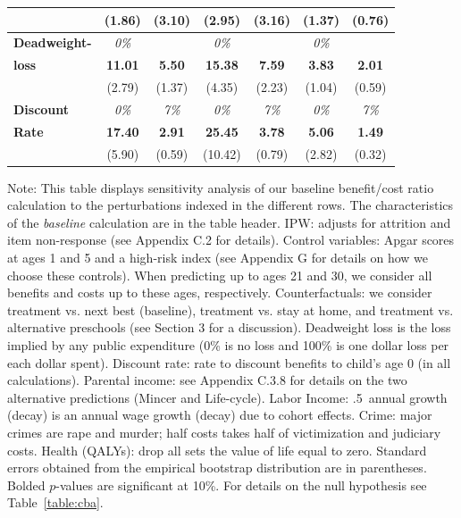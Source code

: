 \documentclass[static]{JJH-Beamer}
\begin{document}
\begin{frame}
\begin{table}[H]
\begin{center}
{\begin{tabular}{>{\bfseries}lcc|cc|cc}
	&	(1.86)	&	(3.10)	&	(2.95)	&	(3.16)	&	(1.37)	&	(0.76)	\\ \midrule
Deadweight-	&	\textit{0\%}	&	\textit{100\%\textit}	&	\textit{0\%}	&	\textit{100\%\textit}	&	\textit{0\%}	&	\textit{100\%\textit}	\\
loss	&	\textbf{11.01}	&	\textbf{5.50}	&	\textbf{15.38}	&	\textbf{7.59}	&	\textbf{3.83}	&	\textbf{2.01}	\\
	&	(2.79)	&	(1.37)	&	(4.35)	&	(2.23)	&	(1.04)	&	(0.59)	\\ \midrule
Discount 	&	\textit{0\%}	&	\textit{7\%}	&	\textit{0\%}	&	\textit{7\%}	&	\textit{0\%}	&	\textit{7\%}	\\
Rate	&	\textbf{17.40}	&	\textbf{2.91}	&	\textbf{25.45}	&	\textbf{3.78}	&	\textbf{5.06}	&	\textbf{1.49}	\\
	&	(5.90)	&	(0.59)	&	(10.42)	&	(0.79)	&	(2.82)	&	(0.32)	\\ 
\bottomrule
\end{tabular}
}
\end{center}
\end{table}

\end{frame}

{\flushleft \small Note: This table displays sensitivity analysis of our baseline benefit/cost ratio calculation to the perturbations indexed in the different rows. The characteristics of the \textit{baseline} calculation are in the table header. IPW: adjusts for attrition and item non-response (see Appendix C.2 for details). Control variables: Apgar scores at ages 1 and 5 and a high-risk index (see Appendix G for details on how we choose these controls). When predicting up to ages 21 and 30, we consider all benefits and costs up to these ages, respectively. Counterfactuals: we consider treatment vs. next best (baseline), treatment vs. stay at home, and treatment vs. alternative preschools (see Section 3 for a discussion). Deadweight loss is the loss implied by any public expenditure (0\% is no loss and 100\% is one dollar loss per each dollar spent). Discount rate: rate to discount benefits to child's age 0 (in all calculations). Parental income: see Appendix C.3.8 for details on the two alternative predictions (Mincer and Life-cycle). Labor Income: .5\ annual growth (decay) is an annual wage growth (decay) due to cohort effects. Crime: major crimes are rape and murder; half costs takes half of victimization and judiciary costs. Health (QALYs): drop all sets the value of life equal to zero. Standard errors obtained from the empirical bootstrap distribution are in parentheses. Bolded $p$-values are significant at 10\%. For details on the null hypothesis see Table~\ref{table:cba}.\\}
\end{document}
